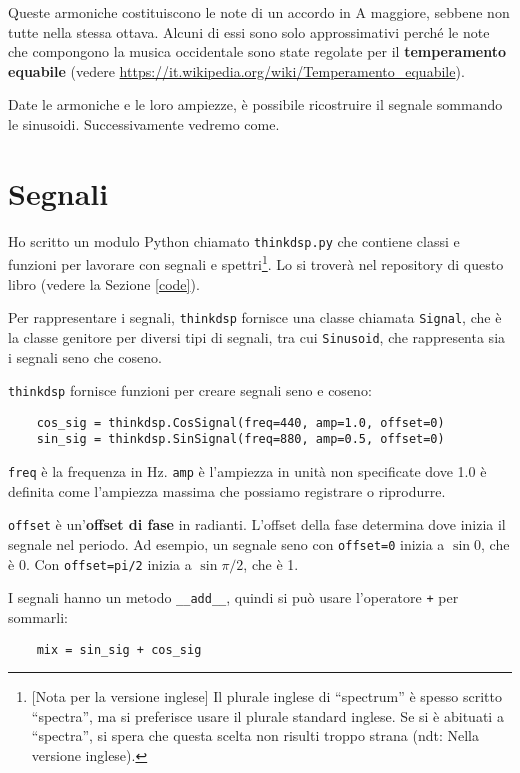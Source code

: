 \documentclass[12pt,a4paper]{book}
\begin{document}
Queste armoniche costituiscono le note di un accordo in A maggiore, sebbene non tutte nella stessa ottava. Alcuni di essi sono solo approssimativi perché le note che compongono la musica occidentale sono state regolate per il {\bf temperamento equabile} (vedere \url{https://it.wikipedia.org/wiki/Temperamento_equabile}).

Date le armoniche e le loro ampiezze, è possibile ricostruire il segnale sommando le sinusoidi. Successivamente vedremo come.

\section{Segnali} 

Ho scritto un modulo Python chiamato {\tt thinkdsp.py} che contiene classi e funzioni per lavorare con segnali e spettri\footnote{[Nota per la versione inglese] Il plurale inglese di ``spectrum'' è spesso scritto ``spectra'', ma si preferisce usare il plurale standard inglese. Se si è abituati a ``spectra'', si spera che questa scelta non risulti troppo strana (ndt: Nella versione inglese).}. Lo si troverà nel repository di questo libro (vedere la Sezione \ref{code}).

Per rappresentare i segnali, {\tt thinkdsp} fornisce una classe chiamata {\tt Signal}, che è la classe genitore per diversi tipi di segnali, tra cui {\tt Sinusoid}, che rappresenta sia i segnali seno che coseno.

{\tt thinkdsp} fornisce funzioni per creare segnali seno e coseno:

\begin{verbatim} 
    cos_sig = thinkdsp.CosSignal(freq=440, amp=1.0, offset=0)
    sin_sig = thinkdsp.SinSignal(freq=880, amp=0.5, offset=0)
 \end{verbatim} 

{\tt freq} è la frequenza in Hz. {\tt amp} è l'ampiezza in unità non specificate dove 1.0 è definita come l'ampiezza massima che possiamo registrare o riprodurre.

{\tt offset} è un'{\bf offset di fase} in radianti. L'offset della fase determina dove inizia il segnale nel periodo. Ad esempio, un segnale seno con {\tt offset=0} inizia a $\sin 0$, che è 0. Con {\tt offset=pi/2} inizia a $\sin \pi/2$, che è 1.

I segnali hanno un metodo \verb"__add__", quindi si può usare l'operatore {\tt +} per sommarli:

\begin{verbatim} 
    mix = sin_sig + cos_sig
 \end{verbatim} 
\end{document}
